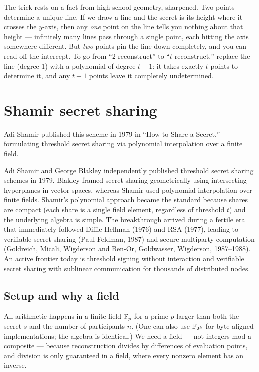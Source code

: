 \begin{intuitionbox}
The trick rests on a fact from high-school geometry, sharpened. Two points determine a unique line. If we draw a line and the secret is its height where it crosses the $y$-axis, then any \emph{one} point on the line tells you nothing about that height --- infinitely many lines pass through a single point, each hitting the axis somewhere different. But \emph{two} points pin the line down completely, and you can read off the intercept. To go from ``2 reconstruct'' to ``$t$ reconstruct,'' replace the line (degree 1) with a polynomial of degree $t-1$: it takes exactly $t$ points to determine it, and any $t-1$ points leave it completely undetermined.
\end{intuitionbox}

\section{Shamir secret sharing}
\label{ch32:shamir}

Adi Shamir published this scheme in 1979 in ``How to Share a Secret,'' formulating threshold secret sharing via polynomial interpolation over a finite field.

\begin{historybox}
Adi Shamir and George Blakley independently published threshold secret sharing schemes in 1979. Blakley framed secret sharing geometrically using intersecting hyperplanes in vector spaces, whereas Shamir used polynomial interpolation over finite fields. Shamir's polynomial approach became the standard because shares are compact (each share is a single field element, regardless of threshold $t$) and the underlying algebra is simple. The breakthrough arrived during a fertile era that immediately followed Diffie-Hellman (1976) and RSA (1977), leading to verifiable secret sharing (Paul Feldman, 1987) and secure multiparty computation (Goldreich, Micali, Wigderson and Ben-Or, Goldwasser, Wigderson, 1987--1988). An active frontier today is threshold signing without interaction and verifiable secret sharing with sublinear communication for thousands of distributed nodes.
\end{historybox}

\subsection{Setup and why a field}
\label{ch32:field}

All arithmetic happens in a finite field $\mathbb{F}_p$ for a prime $p$ larger than both the secret $s$ and the number of participants $n$. (One can also use $\mathbb{F}_{2^k}$ for byte-aligned implementations; the algebra is identical.) We need a field --- not integers mod a composite --- because reconstruction divides by differences of evaluation points, and division is only guaranteed in a field, where every nonzero element has an inverse.

